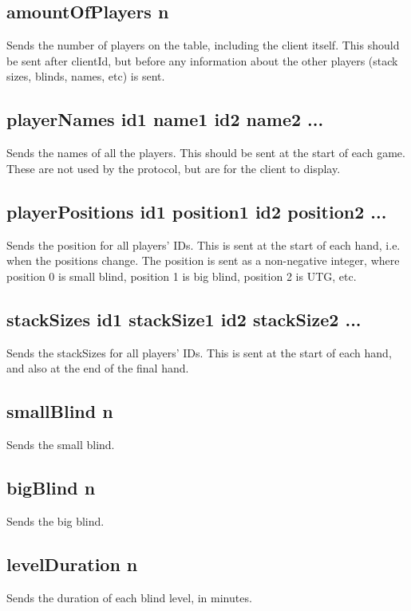 \documentclass{article}
\begin{document}
\subsection*{amountOfPlayers \textlangle{}n\textrangle{}}
Sends the number of players on the table, including the client itself. This should be sent after clientId, but before any information about the other players (stack sizes, blinds, names, etc) is sent.

\subsection*{playerNames \textlangle{}id1 name1\textrangle{} \textlangle{}id2 name2\textrangle{} ... }
Sends the names of all the players. This should be sent at the start of each game. These are not used by the protocol, but are for the client to display.

\subsection*{playerPositions \textlangle{}id1 position1\textrangle{} \textlangle{}id2 position2\textrangle{} ... }
Sends the position for all players' IDs. This is sent at the start of each hand, i.e. when the positions change. The position is sent as a non-negative integer, where position 0 is small blind, position 1 is big blind, position 2 is UTG, etc.

\subsection*{stackSizes \textlangle{}id1 stackSize1\textrangle{} \textlangle{}id2 stackSize2\textrangle{} ... }
Sends the stackSizes for all players' IDs. This is sent at the start of each hand, and also at the end of the final hand.

\subsection*{smallBlind \textlangle{}n\textrangle{}}
Sends the small blind.

\subsection*{bigBlind \textlangle{}n\textrangle{}}
Sends the big blind.

\subsection*{levelDuration \textlangle{}n\textrangle{}}
Sends the duration of each blind level, in minutes.
\end{document}
